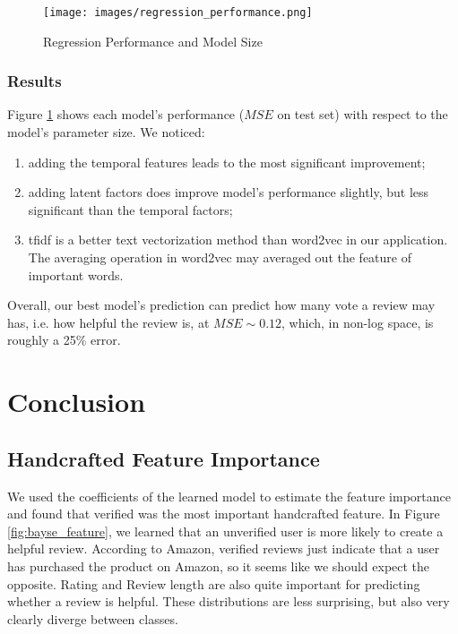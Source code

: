 \documentclass[final]{cvpr}
\begin{document}
\begin{figure}[h]
\texttt{[image: images/regression\_performance.png]}
\caption{Regression Performance and Model Size }
\label{fig:regression_performance}
\end{figure}

\subsubsection{Results}
Figure \ref{fig:regression_performance} shows each model's performance ($MSE$ on test set) with respect to the model's parameter size.
We noticed:
\begin{enumerate}
\item adding the temporal features leads to the most significant improvement;
\item adding latent factors does improve model's performance slightly, but less significant than the temporal factors;
\item tfidf is a better text vectorization method than word2vec in our application. The averaging operation in word2vec may averaged out the feature of important words. 
\end{enumerate}

Overall, our best model's prediction can predict how many vote a review may has, i.e. how helpful the review is, at $MSE \sim 0.12$, which, in non-log space, is roughly a 25\% error.


\newpage
\section{Conclusion}

\subsection{Handcrafted Feature Importance}

We used the coefficients of the learned model to estimate the feature importance and found that verified was the most important handcrafted feature. In Figure \ref{fig:bayse_feature}, we learned that an unverified user is more likely to create a helpful review. According to Amazon, verified reviews just indicate that a user has purchased the product on Amazon, so it seems like we should expect the opposite. Rating and Review length are also quite important for predicting whether a review is helpful. These distributions are less surprising, but also very clearly diverge between classes.
\end{document}
